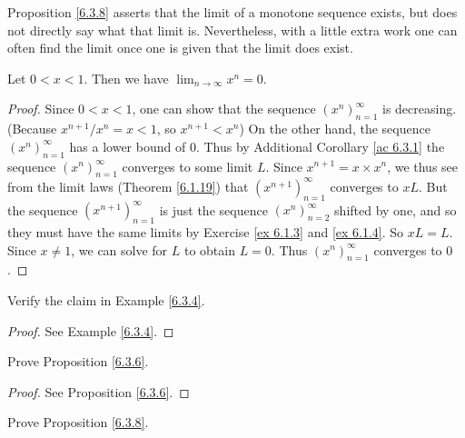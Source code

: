 \begin{note}
Proposition \ref{6.3.8} asserts that the limit of a monotone sequence exists, but does not directly say what that limit is.
Nevertheless, with a little extra work one can often find the limit once one is given that the limit does exist.
\end{note}

\begin{proposition}\label{6.3.10}
Let \(0 < x < 1\).
Then we have \(\lim_{n \to \infty} x^n = 0\).
\end{proposition}

\begin{proof}
Since \(0 < x < 1\), one can show that the sequence \((x^n)_{n = 1}^\infty\) is decreasing.
(Because \(x^{n + 1} / x^n = x < 1\), so \(x^{n + 1} < x^n\))
On the other hand, the sequence \((x^n)_{n = 1}^\infty\) has a lower bound of \(0\).
Thus by Additional Corollary \ref{ac 6.3.1} the sequence \((x^n)_{n = 1}^\infty\) converges to some limit \(L\).
Since \(x^{n + 1} = x \times x^n\), we thus see from the limit laws (Theorem \ref{6.1.19}) that \((x^{n + 1})_{n = 1}^\infty\) converges to \(xL\).
But the sequence \((x^{n + 1})_{n = 1}^\infty\) is just the sequence \((x^n)_{n = 2}^\infty\) shifted by one, and so they must have the same limits by Exercise \ref{ex 6.1.3} and \ref{ex 6.1.4}.
So \(xL = L\).
Since \(x \neq 1\), we can solve for \(L\) to obtain \(L = 0\).
Thus \((x^n)_{n = 1}^\infty\) converges to \(0\).
\end{proof}

\exercisesection

\begin{exercise}\label{ex 6.3.1}
Verify the claim in Example \ref{6.3.4}.
\end{exercise}

\begin{proof}
See Example \ref{6.3.4}.
\end{proof}

\begin{exercise}\label{ex 6.3.2}
Prove Proposition \ref{6.3.6}.
\end{exercise}

\begin{proof}
See Proposition \ref{6.3.6}.
\end{proof}

\begin{exercise}\label{ex 6.3.3}
Prove Proposition \ref{6.3.8}.
\end{exercise}

